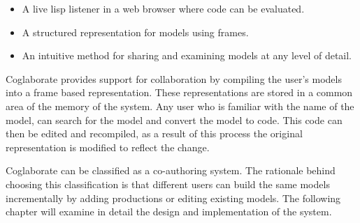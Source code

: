 \begin{itemize}
\item A live lisp listener in a web browser where code can be evaluated.
\item A structured representation for models using frames.
\item An intuitive method for sharing and examining models at any
  level of detail.
\end{itemize}

Coglaborate provides support for collaboration by compiling the user's
models into a frame based representation. These representations are
stored in a common area of the memory of the system. Any user who is
familiar with the name of the model, can search for the model and
convert the model to code. This code can then be edited and
recompiled, as a result of this process the original representation is
modified to reflect the change.

Coglaborate can be classified as a co-authoring system. The rationale
behind choosing this classification is that different users can build
the same models incrementally by adding productions or editing
existing models. The following chapter will examine in detail the
design and implementation of the system.

